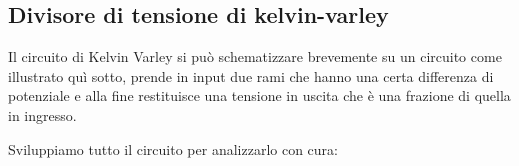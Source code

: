 \documentclass[a4paper, oneside]{article}
\begin{document}
\subsection{Divisore di tensione di kelvin-varley}
Il circuito di Kelvin Varley si può schematizzare brevemente su un circuito come illustrato quì sotto, prende in input due rami che hanno una certa differenza di potenziale e alla fine restituisce una tensione in uscita che è una frazione di quella in ingresso.
\begin{center}
\end{center}
Sviluppiamo tutto il circuito per analizzarlo con cura:
\end{document}
